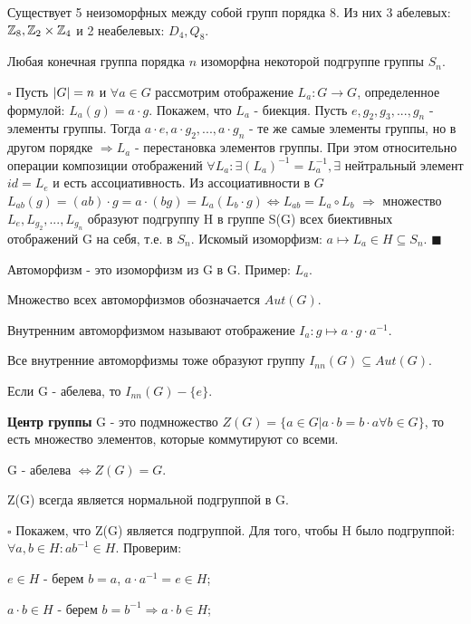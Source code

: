 \documentclass[../main.tex]{subfiles}
\begin{document}
\void
{} Существует 5 неизоморфных между собой групп порядка 8. Из них 3
абелевых: $\mathbb{Z}_8, \mathbb{Z}_2\times\mathbb{Z}_4$ и 2 неабелевых: $D_4, Q_8$.

\void
{}

Любая конечная группа порядка $n$ изоморфна некоторой подгруппе группы $S_n$.

\void
$\square$ Пусть $\vert G\vert = n$ и $\forall a\in G$ рассмотрим отображение
$L_a: G\rightarrow G$, определенное формулой: $L_a(g) = a\cdot g$. Покажем, что
$L_a$ - биекция. Пусть $e, g_2, g_3,...,g_n$ - элементы группы. Тогда
$a\cdot e, a\cdot g_2,...,a\cdot g_n$ - те же самые элементы группы, но в
другом порядке $\Longrightarrow L_a$ - перестановка элементов группы.
При этом относительно операции композиции отображений $\forall L_a: \exists (L_a)^{-1} =
L_a^{-1}, \exists$ нейтральный элемент $id = L_e$ и есть ассоциативность. Из ассоциативности
в $G$ $L_{ab}(g) = (ab)\cdot g = a\cdot (bg) = L_a(L_b\cdot g) \Leftrightarrow L_{ab} = L_a\circ L_b$
$\Rightarrow$ множество $L_e, L_{g_2},...,L_{g_n}$ образуют подгруппу H в группе S(G) всех
биективных отображений G на себя, т.е. в $S_n$. Искомый изоморфизм:
$a \mapsto L_a\in H\subseteq S_n$. $\blacksquare$ 

\void{} Автоморфизм - это изоморфизм из G в G. Пример: $L_a$.

\void{} Множество всех автоморфизмов обозначается $Aut(G)$.

\void{} Внутренним автоморфизмом называют отображение $I_a: g\mapsto a\cdot g\cdot a^{-1}$.

\void{} Все внутренние автоморфизмы тоже образуют группу
$I_{nn}(G)\subseteq Aut(G)$.

\void{} Если G - абелева, то $I_{nn}(G) - \{e\}$.

\void{} \textbf{Центр группы} G - это подмножество $Z(G) = \{a\in G\vert a\cdot b = b\cdot a \forall b\in G\}$, то
есть множество элементов, которые коммутируют со всеми.

\void{} G - абелева $\Longleftrightarrow Z(G) = G$.

\void{} Z(G) всегда является нормальной подгруппой в G.

\void
$\square$ Покажем, что Z(G) является подгруппой. Для того, чтобы H было подгруппой:
$\forall a,b\in H: ab^{-1}\in H$. Проверим:

\void{} $e\in H$ - берем $b = a$, $a\cdot a^{-1} = e\in H$;

 $a\cdot b\in H$ - берем $b = b^{-1} \Longrightarrow a\cdot b\in H$;
\end{document}
